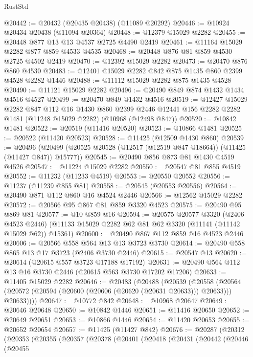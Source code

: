 \begin{lexlean}{RustStd}
\begin{coremodule}
@20442 := @20432 (@20435 @20438) (@11089 @20292)
@20446 := @10924 @20434 @20438 (@11094 @20364)
@20448 := @12379 @15029 @2282
@20455 := @20448 @877 @13 @13 @4537 @2725 @4490 @2419
@20461 := @11164 @15029 @2282 @877 @859 @4533 @4535
@20468 := @20448 @876 @81 @859 @4530 @2725 @4502 @2419
@20470 := @12392 @15029 @2282
@20473 := @20470 @876 @860 @4530
@20483 := @12401 @15029 @2282 @842 @875 @1435 @860 @2399 @4528 @2282 @1446
@20488 := @11112 @15029 @2282 @875 @1435 @4528
@20490 := @11121 @15029 @2282
@20496 := @20490 @849 @874 @1432 @1434 @4516 @4527
@20499 := @20470 @849 @1432 @4516
@20519 := @12427
    @15029
    @2282
    @847
    @112
    @16
    @1430
    @860
    @2399
    @2446
    @12441
    @156
    @2282
    @2282
    @1481
    (@11248 @15029 @2282)
    (@10968 (@12498 @847))
@20520 := @10842 @1481
@20522 := @20519 (@11416 @20520)
@20523 := @10866 @1481
@20525 := @20522 (@11420 @20523)
@20528 := @11425 (@12509 @1430 @860)
@20539 := @20496
    (@20499 (@20525 @20528 (@12517 (@12519 @847 @18664)) (@11425 (@11427 @847)) @15777))
@20545 := @20490 @856 @873 @81 @1430 @4519 @4526
@20547 := @11224 @15029 @2282
@20550 := @20547 @81 @855 @4519
@20552 := @11232 (@11233 @4519)
@20553 := @20550 @20552
@20556 := @11237 (@11239 @855 @81)
@20558 := @20545 (@20553 @20556)
@20564 := @20490 @871 @112 @860 @16 @4524 @2446
@20566 := @12562 @15029 @2282
@20572 := @20566 @95 @867 @81 @859 @3320 @4523
@20575 := @20490 @95 @869 @81
@20577 := @10 @859 @16
@20594 := @20575
    @20577
    @3320
    (@2406 @4523 @2446)
    (@11133 @15029 @2282 @62 @81 @62 @3320 (@11141 (@11142 @15029 @62)) @15361)
@20600 := @20490 @867 @112 @859 @16 @4523 @2446
@20606 := @20566 @558 @564 @13 @13 @3723 @3730
@20614 := @20490 @558 @865 @13 @17 @3723 (@2406 @3730 @2446)
@20615 := @20547 @13
@20620 := @20614 (@20615 @557 @3723 @17188 @17192)
@20631 := @20490 @564 @112 @13 @16 @3730 @2446 (@20615 @563 @3730 @17202 @17206)
@20633 := @11405 @15029 @2282
@20646 := @20483
    (@20488
      (@20539
        (@20558
          (@20564 (@20572 (@20594 (@20600 (@20606 (@20620 (@20631 @20633))) @20633))) @20633))))
@20647 := @10772 @842
@20648 := @10968 @20647
@20649 := @20646 @20648
@20650 := @10842 @1446
@20651 := @11416 @20650
@20652 := @20649 @20651
@20653 := @10866 @1446
@20654 := @11420 @20653
@20655 := @20652 @20654
@20657 := @11425 (@11427 @842)
@20676 := @20287
    (@20312
      (@20353
        (@20355
          (@20357
            (@20378
              (@20401
                (@20418
                  (@20431
                    (@20442
                      (@20446
                        (@20455

\end{coremodule}
\end{lexlean}
